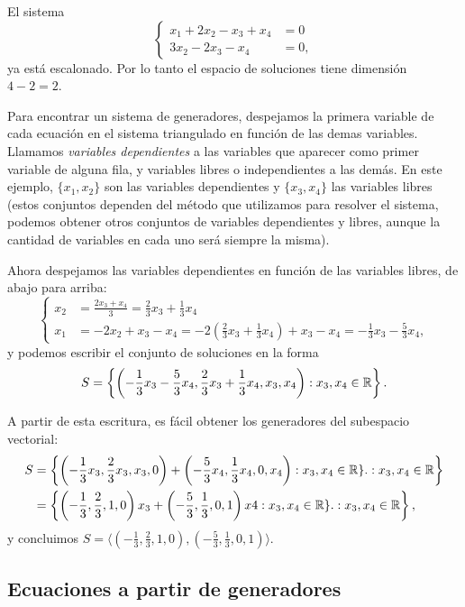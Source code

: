 \begin{ejemplo}
El sistema
$$ \left\{
\begin{aligned}
x_1 + 2 x_2 - x_3 + x_4&= 0 \\
3 x_2 - 2 x_3 - x_4 &= 0,
\end{aligned}
\right.
$$
ya está escalonado. Por lo tanto el espacio de soluciones tiene dimensión $4 -2  = 2$.

Para encontrar un sistema de generadores, despejamos la primera variable de cada ecuación en el sistema triangulado en función de las demas variables. Llamamos \emph{variables dependientes} a las variables que aparecer como primer variable de alguna fila, y variables libres o independientes a las dem\'as. En este ejemplo, $\{x_1, x_2\}$ son las variables dependientes y $\{x_3, x_4\}$ las variables libres (estos conjuntos dependen del método que utilizamos para resolver el sistema, podemos obtener otros conjuntos de variables dependientes y libres, aunque la cantidad de variables en cada uno será siempre la misma).

Ahora despejamos las variables dependientes en función de las variables libres, de abajo para arriba:
$$\left\{
\begin{aligned}
x_2 &= \frac{2x_3 + x_4}{3} = \frac{2}{3} x_3 + \frac{1}{3} x_4 \\
x_1 &= -2x_2 + x_3 - x_4 = -2\left(\frac{2}{3} x_3 + \frac{1}{3} x_4\right) + x_3 - x_4 = -\frac{1}{3} x_3 - \frac{5}{3} x_4,
\end{aligned}
\right.
$$
y podemos escribir el conjunto de soluciones en la forma
$$
S =\left\{\left(-\frac{1}{3} x_3 -\frac{5}{3} x_4, \frac{2}{3} x_3 + \frac{1}{3} x_4, x_3, x_4\right): x_3, x_4 \in \mathbb R\right\}.
$$

A partir de esta escritura, es fácil obtener los generadores del subespacio vectorial:
$$
\begin{aligned}
S &=\left\{\left(-\frac{1}{3} x_3, \frac{2}{3} x_3, x_3, 0\right) + \left(-\frac{5}{3} x_4, \frac{1}{3} x_4, 0, x_4\right): x_3, x_4 \in \mathbb R\}.: x_3, x_4 \in \mathbb R\right\} \\
&=\left\{\left(-\frac{1}{3}, \frac{2}{3} , 1, 0\right)x_3 + \left(-\frac{5}{3}, \frac{1}{3} , 0, 1\right) x4: x_3, x_4 \in \mathbb R\}.: x_3, x_4 \in \mathbb R\right\},
\end{aligned}
$$
y concluimos $S = \langle \left(-\frac{1}{3}, \frac{2}{3} , 1, 0\right), \left(-\frac{5}{3}, \frac{1}{3} , 0, 1\right)\rangle$.
\end{ejemplo}


\subsection{Ecuaciones a partir de generadores}


